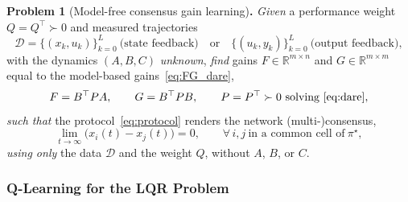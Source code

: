 \documentclass[12pt]{elsarticle}
\theoremstyle{remark}
\newcommand{\R}{\mathbb{R}}
\begin{document}
\smallskip
\noindent\textbf{Problem 1} (Model-free consensus gain learning)\textbf{.}
\emph{Given} a performance weight $Q = Q^\top \succ 0$ and measured trajectories
\begin{equation}
\mathcal{D} = \big\{(x_k, u_k)\big\}_{k=0}^{L}\ \text{(state feedback)}\quad\text{or}\quad \big\{(u_k, y_k)\big\}_{k=0}^{L}\ \text{(output feedback)},
\label{eq:data}
\end{equation}
with the dynamics $(A,B,C)$ \emph{unknown}, \emph{find} gains $F \in \R^{m\times n}$ and $G \in \R^{m\times m}$ equal to the model-based gains~\eqref{eq:FG_dare},
\begin{equation}
F = B^\top P A, \qquad G = B^\top P B, \qquad P = P^\top \succ 0 \ \text{solving}\ \eqref{eq:dare},
\label{eq:goal_gains}
\end{equation}
\emph{such that} the protocol~\eqref{eq:protocol} renders the network (multi-)consensus,
\begin{equation}
\lim_{t\to\infty}\big(x_i(t) - x_j(t)\big) = 0, \qquad \forall\, i,j\ \text{in a common cell of}\ \pi^\star,
\label{eq:consensus_goal}
\end{equation}
\emph{using only} the data $\mathcal{D}$ and the weight $Q$, without $A$, $B$, or $C$.

\subsubsection{Q-Learning for the LQR Problem}
\label{subsec:ql_background}
\end{document}
